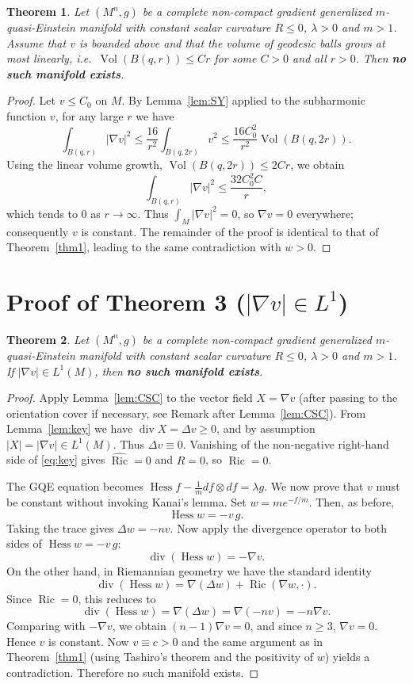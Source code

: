 \documentclass[10pt,a4paper]{amsart}
\newcommand{\Ric}{\operatorname{Ric}}
\newcommand{\Hess}{\operatorname{Hess}}
\newcommand{\divg}{\operatorname{div}}
\newcommand{\Vol}{\operatorname{Vol}}
\newtheorem{theorem}{Theorem}[section]
\begin{document}
\begin{theorem}\label{thm2}
Let $(M^n,g)$ be a complete non-compact gradient generalized $m$-quasi-Einstein manifold with constant scalar curvature $R\le 0$, $\lambda>0$ and $m>1$.
Assume that $v$ is bounded above and that the volume of geodesic balls grows at most linearly, i.e.\ $\Vol(B(q,r)) \le C r$ for some $C>0$ and all $r>0$.
Then \textbf{no such manifold exists}.
\end{theorem}

\begin{proof}
Let $v\le C_0$ on $M$.
By Lemma~\ref{lem:SY} applied to the subharmonic function $v$, for any large $r$ we have
\[
\int_{B(q,r)}|\nabla v|^2 \le \frac{16}{r^2}\int_{B(q,2r)} v^2
\le \frac{16 C_0^2}{r^2}\Vol(B(q,2r)).
\]
Using the linear volume growth, $\Vol(B(q,2r))\le 2C r$, we obtain
\[
\int_{B(q,r)}|\nabla v|^2 \le \frac{32 C_0^2 C}{r},
\]
which tends to $0$ as $r\to\infty$.
Thus $\int_M |\nabla v|^2 = 0$, so $\nabla v=0$ everywhere; consequently $v$ is constant.
The remainder of the proof is identical to that of Theorem~\ref{thm1}, leading to the same contradiction with $w>0$.
\end{proof}

\section{Proof of Theorem 3 ($|\nabla v|\in L^1$)}
\label{sec:thm3}

\begin{theorem}\label{thm3}
Let $(M^n,g)$ be a complete non-compact gradient generalized $m$-quasi-Einstein manifold with constant scalar curvature $R\le 0$, $\lambda>0$ and $m>1$.
If $|\nabla v|\in L^1(M)$, then \textbf{no such manifold exists}.
\end{theorem}

\begin{proof}
Apply Lemma~\ref{lem:CSC} to the vector field $X = \nabla v$ (after passing to the orientation cover if necessary, see Remark after Lemma~\ref{lem:CSC}).
From Lemma~\ref{lem:key} we have $\divg X = \Delta v \ge 0$, and by assumption $|X| = |\nabla v|\in L^1(M)$.
Thus $\Delta v \equiv 0$.
Vanishing of the non-negative right-hand side of \eqref{eq:key} gives $\hat{\Ric}=0$ and $R=0$, so $\Ric=0$.

The GQE equation becomes $\Hess f - \frac1m df\otimes df = \lambda g$. 
We now prove that $v$ must be constant without invoking Kanai's lemma.
Set $w = m e^{-f/m}$. Then, as before,
\[
\Hess w = -v\,g.
\]
Taking the trace gives $\Delta w = -n v$.
Now apply the divergence operator to both sides of $\Hess w = -v\,g$:
\[
\divg(\Hess w) = -\nabla v.
\]
On the other hand, in Riemannian geometry we have the standard identity
\[
\divg(\Hess w) = \nabla(\Delta w) + \Ric(\nabla w, \cdot).
\]
Since $\Ric=0$, this reduces to
\[
\divg(\Hess w) = \nabla(\Delta w) = \nabla(-n v) = -n\nabla v.
\]
Comparing with $-\nabla v$, we obtain $(n-1)\nabla v = 0$, and since $n\ge 3$, $\nabla v = 0$. Hence $v$ is constant.
Now $v\equiv c>0$ and the same argument as in Theorem~\ref{thm1} (using Tashiro's theorem and the positivity of $w$) yields a contradiction.
Therefore no such manifold exists.
\end{proof}
\end{document}
